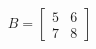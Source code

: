 \documentclass[preview]{standalone}
\begin{document}
\begin{align*}
B = \begin{bmatrix} 5 & 6 \\ 7 & 8 \end{bmatrix}
\end{align*}
\end{document}
